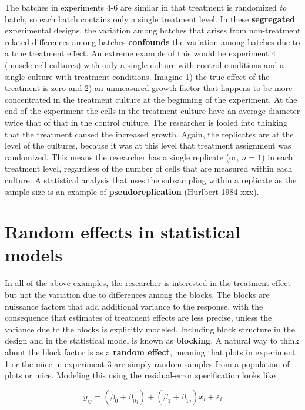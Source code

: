 \documentclass[]{book}
\begin{document}
The batches in experiments 4-6 are similar in that treatment is randomized \emph{to} batch, so each batch contains only a single treatment level. In these \textbf{segregated} experimental designs, the variation among batches that arises from non-treatment related differences among batches \textbf{confounds} the variation among batches due to a true treatment effect. An extreme example of this would be experiment 4 (muscle cell cultures) with only a single culture with control conditions and a single culture with treatment conditions. Imagine 1) the true effect of the treatment is zero and 2) an unmeasured growth factor that happens to be more concentrated in the treatment culture at the beginning of the experiment. At the end of the experiment the cells in the treatment culture have an average diameter twice that of that in the control culture. The researcher is fooled into thinking that the treatment caused the increased growth. Again, the replicates are at the level of the cultures, because it was at this level that treatment assignment was randomized. This means the researcher has a single replicate (or, \(n=1\)) in each treatment level, regardless of the number of cells that are measured within each culture. A statistical analysis that uses the subsampling within a replicate as the sample size is an example of \textbf{pseudoreplication} (Hurlbert 1984 xxx).

\hypertarget{random-effects-in-statistical-models}{%
\section{Random effects in statistical models}\label{random-effects-in-statistical-models}}

In all of the above examples, the researcher is interested in the treatment effect but not the variation due to differences among the blocks. The blocks are nuissance factors that add additional variance to the response, with the consequence that estimates of treatment effects are less precise, unless the variance due to the blocks is explicitly modeled. Including block structure in the design and in the statistical model is known as \textbf{blocking}. A natural way to think about the block factor is as a \textbf{random effect}, meaning that plots in experiment 1 or the mice in experiment 3 are simply random samples from a population of plots or mice. Modeling this using the residual-error specification looks like

\begin{equation}
y_{ij} = (\beta_{0} + \beta_{0j}) + (\beta_{1} + \beta_{1j}) x_i + \varepsilon_i 
\label{eq:lmm-spec1}
\end{equation}
\end{document}
